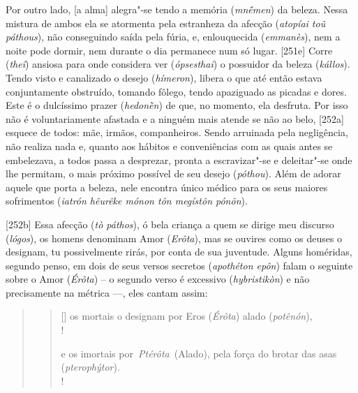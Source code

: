 Por outro lado, [a alma] alegra"-se tendo a memória (\emph{mnḗmen})
da beleza. Nessa mistura de ambos ela se atormenta pela estranheza da
afecção (\emph{atopíai toû páthous}), não conseguindo saída pela fúria,
e, enlouquecida (\emph{emmanès}), nem a noite pode dormir, nem durante o
dia permanece num só lugar. [251e] Corre (\emph{theî}) ansiosa para
onde considera ver (\emph{ópsesthai}) o possuidor da beleza
(\emph{kállos}). Tendo visto e canalizado o desejo (\emph{hímeron}),
libera o que até então estava conjuntamente obstruído, tomando fôlego,
tendo apaziguado as picadas e dores. Este é o dulcíssimo prazer
(\emph{hedonḕn}) de que, no momento, ela desfruta. Por isso não é
voluntariamente afastada e a ninguém mais atende se não ao belo,
[252a] esquece de todos: mãe, irmãos, companheiros. Sendo arruinada
pela negligência, não realiza nada e, quanto aos hábitos e conveniências
com as quais antes se embelezava, a todos passa a desprezar, pronta a
escravizar"-se e deleitar"-se onde lhe permitam, o mais próximo possível
de seu desejo (\emph{póthou}). Além de adorar aquele que porta a beleza,
nele encontra único médico para os seus maiores sofrimentos
(\emph{iatrón hêurêke mónon tôn megístôn pónôn}).

[252b] Essa afecção (\emph{tò páthos}), ó bela criança a quem se
dirige meu discurso (\emph{lógos}), os homens denominam Amor
(\emph{Erôta}), mas se ouvires como os deuses o designam, tu
possivelmente rirás, por conta de sua juventude. Alguns homéridas,
segundo penso, em dois de seus versos secretos (\emph{apothéton epôn})
falam o seguinte sobre o Amor (\emph{Érôta}) -- o segundo verso é
excessivo (\emph{hybristikòn}) e não precisamente na métrica \mbox{---,} eles
cantam assim:

\begin{quote}
 


\begin{verse}[\versewidth]
os mortais o designam por Eros (\emph{Érôta}) alado (\emph{potênón}),\\!

e os imortais por\emph{~Ptérôta}~(Alado), pela força do brotar das asas
(\emph{pterophýtor}).\\!
\end{verse} 
\end{quote}

 

